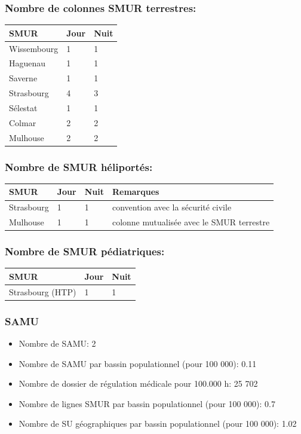 \documentclass[]{article}
\begin{document}
\subsubsection{Nombre de colonnes SMUR
terrestres:}\label{nombre-de-colonnes-smur-terrestres}

\begin{longtable}[c]{@{}lll@{}}
\toprule
SMUR & Jour & Nuit\tabularnewline
\midrule
\endhead
Wissembourg & 1 & 1\tabularnewline
Haguenau & 1 & 1\tabularnewline
Saverne & 1 & 1\tabularnewline
Strasbourg & 4 & 3\tabularnewline
Sélestat & 1 & 1\tabularnewline
Colmar & 2 & 2\tabularnewline
Mulhouse & 2 & 2\tabularnewline
\bottomrule
\end{longtable}

\subsubsection{Nombre de SMUR
héliportés:}\label{nombre-de-smur-heliportes}

\begin{longtable}[c]{@{}llll@{}}
\toprule
SMUR & Jour & Nuit & Remarques\tabularnewline
\midrule
\endhead
Strasbourg & 1 & 1 & convention avec la sécurité civile\tabularnewline
Mulhouse & 1 & 1 & colonne mutualisée avec le SMUR
terrestre\tabularnewline
\bottomrule
\end{longtable}

\subsubsection{Nombre de SMUR
pédiatriques:}\label{nombre-de-smur-pediatriques}

\begin{longtable}[c]{@{}lll@{}}
\toprule
SMUR & Jour & Nuit\tabularnewline
\midrule
\endhead
Strasbourg (HTP) & 1 & 1\tabularnewline
\bottomrule
\end{longtable}

\subsubsection{SAMU}\label{samu}

\begin{itemize}
\itemsep1pt\parskip0pt
\item
  Nombre de SAMU: 2
\item
  Nombre de SAMU par bassin populationnel (pour 100 000): 0.11
\item
  Nombre de dossier de régulation médicale pour 100.000 h: 25 702
\item
  Nombre de lignes SMUR par bassin populationnel (pour 100 000): 0.7
\item
  Nombre de SU géographiques par bassin populationnel (pour 100 000):
  1.02
\end{itemize}
\end{document}
